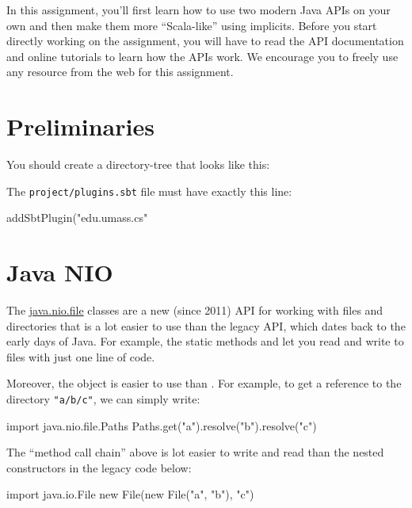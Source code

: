 
In this assignment, you'll first learn how to use two modern Java APIs on your own and then make them more ``Scala-like'' using implicits. Before you start directly working on the assignment, you will have to read the API documentation and online tutorials to learn how the APIs work. We encourage you to freely use any resource from the web for this assignment.

\section{Preliminaries}

You should create a directory-tree that looks like this:


The \texttt{project/plugins.sbt} file must have exactly this line:

\begin{scalacode}
addSbtPlugin("edu.umass.cs" %
\end{scalacode}

\section{Java NIO}

The \href{https://docs.oracle.com/javase/7/docs/api/java/nio/file/package-summary.html#package_description}{java.nio.file} classes are a new (since 2011) API for working with files and directories that is a lot easier to use than the legacy API, which dates back to the early days of Java. For example, the static methods  and  let you read and write to files with just one line of code.

Moreover, the  object is easier to use than . For example, to get a reference to the directory \texttt{"a/b/c"}, we can simply write:
%
\begin{scalacode}
import java.nio.file.Paths
Paths.get("a").resolve("b").resolve("c")
\end{scalacode}
%
The ``method call chain'' above is lot easier to write and read than the nested constructors in the legacy code below:
%
\begin{scalacode}
import java.io.File
new File(new File("a", "b"), "c")
\end{scalacode}

